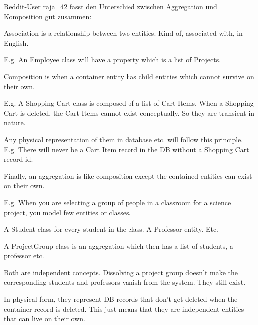 \documentclass{abgabe}
\begin{document}
\begin{questions}
\begin{solution}
        Reddit-User \href{https://www.reddit.com/r/javahelp/comments/gpnqij/comment/frnuudx/?utm_source=share&utm_medium=web2x&context=3}{raja\_42} fasst den Unterschied zwischen Aggregation und Komposition gut zusammen:
        \begin{displayquote}
            Association is a relationship between two entities. Kind of, associated with, in English.

            E.g. An Employee class will have a property which is a list of Projects.

            Composition is when a container entity has child entities which cannot survive on their own.

            E.g. A Shopping Cart class is composed of a list of Cart Items. When a Shopping Cart is deleted, the Cart Items cannot exist conceptually. So they are transient in nature.

            Any physical representation of them in database etc. will follow this principle. E.g. There will never be a Cart Item record in the DB without a Shopping Cart record id.

            Finally, an aggregation is like composition except the contained entities can exist on their own.

            E.g. When you are selecting a group of people in a classroom for a science project, you model few entities or classes.

            A Student class for every student in the class. A Professor entity. Etc.

            A ProjectGroup class is an aggregation which then has a list of students, a professor etc.

            Both are independent concepts. Dissolving a project group doesn't make the corresponding students and professors vanish from the system. They still exist.

            In physical form, they represent DB records that don't get deleted when the container record is deleted. This just means that they are independent entities that can live on their own.
        \end{displayquote}
    \end{solution}
\end{questions}
\end{document}
